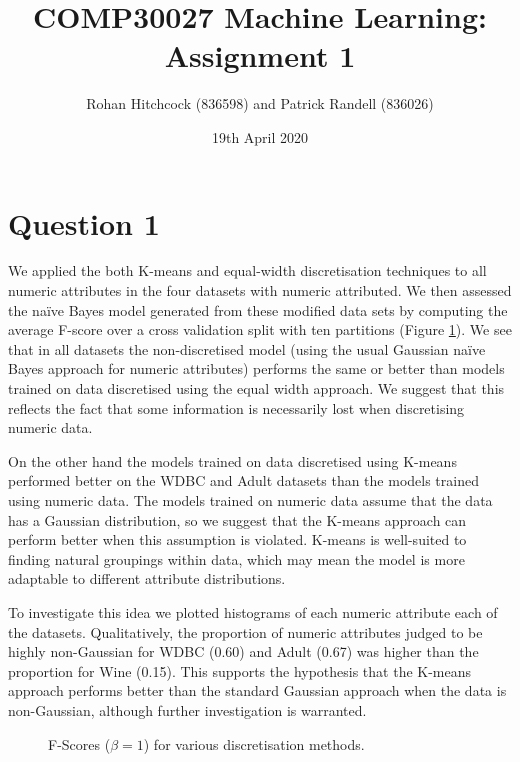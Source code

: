 \documentclass[11pt]{article}
\begin{document}
    \title{\textbf{COMP30027 Machine Learning: Assignment 1}}
    \author{Rohan Hitchcock (836598) and Patrick Randell (836026)}
    \date{19th April 2020}
    \maketitle

    \section*{Question 1}
    We applied the both K-means and equal-width discretisation techniques to all numeric attributes in the four datasets with numeric attributed. We then assessed the na\"{i}ve Bayes model generated from these modified data sets by computing the average F-score over a cross validation split with ten partitions (Figure \ref{fig:q1-discretised-fscores}). We see that in all datasets the non-discretised model (using the usual Gaussian na\"{i}ve Bayes approach for numeric attributes) performs the same or better than models trained on data discretised using the equal width approach. We suggest that this reflects the fact that some information is necessarily lost when discretising numeric data. 

    On the other hand the models trained on data discretised using K-means performed better on the WDBC and Adult datasets than the models trained using numeric data. The models trained on numeric data assume that the data has a Gaussian distribution, so we suggest that the K-means approach can perform better when this assumption is violated. K-means is well-suited to finding natural groupings within data, which may mean the model is more adaptable to different attribute distributions.

    To investigate this idea we plotted histograms of each numeric attribute each of the datasets. Qualitatively, the proportion of numeric attributes judged to be highly non-Gaussian for WDBC (0.60) and Adult (0.67) was higher than the proportion for Wine (0.15). This supports the hypothesis that the K-means approach performs better than the standard Gaussian approach when the data is non-Gaussian, although further investigation is warranted. 

    \begin{figure}[H]
        \centering
        \def\svgwidth{\columnwidth}
        \fbox{\scalebox{0.75}{}}
        \caption{F-Scores ($\beta = 1$) for various discretisation methods.}
        \label{fig:q1-discretised-fscores}
    \end{figure}
\end{document}
